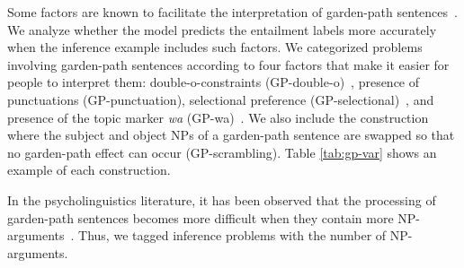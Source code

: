 \documentclass[11pt]{article}
\begin{document}
Some factors are known to facilitate the interpretation of garden-path sentences~\cite{miyamoto08}.
We analyze whether the model predicts the entailment labels more accurately when the inference example includes such factors.
We categorized problems involving garden-path sentences according to four factors that make it easier for people to interpret them: double-o-constraints (GP-double-o)~\cite{miyamoto2002case}, presence of punctuations (GP-punctuation), selectional preference (GP-selectional)~\cite{inoue2006}, and presence of the topic marker \textit{wa} (GP-wa)~\cite{inoue1991}.
We also include the construction where the subject and object NPs of a garden-path sentence are swapped so that no garden-path effect can occur (GP-scrambling). Table \ref{tab:gp-var} shows an example of each construction.

In the psycholinguistics literature, it has been observed that the processing of garden-path sentences becomes more difficult 
when they contain more NP-arguments~\cite{inoue1990b}.
Thus, we tagged inference problems with the number of NP-arguments.

\begin{table}
\centering
{}%
\caption{Statistics of linguistic phenomena.}
\label{tab:stat-ling}
\end{table}
\end{document}
